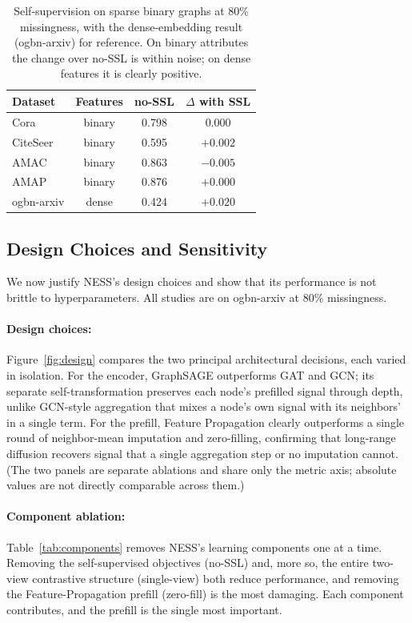 \begin{table}[t]
\centering
\caption{Self-supervision on sparse binary graphs at $80\%$ missingness, with the dense-embedding result (ogbn-arxiv) for reference. On binary attributes the change over no-SSL is within noise; on dense features it is clearly positive.}
\label{tab:regime}
\small
\begin{tabular}{@{}lccc@{}}
\toprule
\textbf{Dataset} & \textbf{Features} & \textbf{no-SSL} & \textbf{$\Delta$ with SSL} \\
\midrule
Cora        & binary  & 0.798 & $0.000$ \\
CiteSeer    & binary  & 0.595 & $+0.002$ \\
AMAC        & binary  & 0.863 & $-0.005$ \\
AMAP        & binary  & 0.876 & $+0.000$ \\
\midrule
ogbn-arxiv  & dense   & 0.424 & $+0.020$ \\
\bottomrule
\end{tabular}
\end{table}


\subsection{Design Choices and Sensitivity}
\label{sec:exp-design}

We now justify NESS's design choices and show that its performance is not brittle to hyperparameters. All studies are on ogbn-arxiv at $80\%$ missingness.

\paragraph{Design choices:} Figure~\ref{fig:design} compares the two principal architectural decisions, each varied in isolation. For the encoder, GraphSAGE outperforms GAT and GCN; its separate self-transformation preserves each node's prefilled signal through depth, unlike GCN-style aggregation that mixes a node's own signal with its neighbors' in a single term. For the prefill, Feature Propagation clearly outperforms a single round of neighbor-mean imputation and zero-filling, confirming that long-range diffusion recovers signal that a single aggregation step or no imputation cannot. (The two panels are separate ablations and share only the metric axis; absolute values are not directly comparable across them.)

\paragraph{Component ablation:} Table~\ref{tab:components} removes NESS's learning components one at a time. Removing the self-supervised objectives (no-SSL) and, more so, the entire two-view contrastive structure (single-view) both reduce performance, and removing the Feature-Propagation prefill (zero-fill) is the most damaging. Each component contributes, and the prefill is the single most important.


